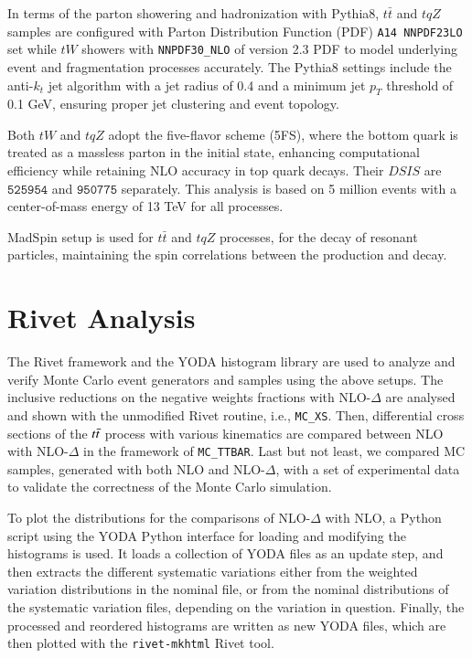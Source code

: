 \documentclass[NOTE, REPORT=true, atlasdraft=true, USenglish]{atlasdoc}
\begin{document}
In terms of the parton showering and hadronization with Pythia8, $t\bar{t}$ and $tqZ$ samples are configured with Parton Distribution Function (PDF) \texttt{A14 NNPDF23LO} set while $tW$ showers with \texttt{NNPDF30\_NLO} of version 2.3 PDF to model underlying event and fragmentation processes accurately. The Pythia8 settings include the anti-$k_t$ jet algorithm with a jet radius of 0.4 and a minimum jet $p_T$ threshold of 0.1 GeV, ensuring proper jet clustering and event topology.

Both $tW$ and $tqZ$ adopt the five-flavor scheme (5FS), where the bottom quark is treated as a massless parton in the initial state, enhancing computational efficiency while retaining NLO accuracy in top quark decays. Their $DSIS$ are 
$\texttt{525954}$ and $\texttt{950775}$ separately. This analysis is based on 5 million events with a center-of-mass energy of 13 TeV for all processes.

MadSpin setup is used for $t\bar{t}$ and $tqZ$ processes, for the decay of resonant particles, maintaining the spin correlations between the production and decay.

\section{Rivet Analysis}
The Rivet framework and the YODA\cite{buckley2024consistentmultidimensionaldifferentialhistogramming} histogram library are used to analyze and verify Monte Carlo event generators and samples using the above setups. The inclusive reductions on the negative weights fractions with NLO-$\Delta$ are analysed and shown with the unmodified Rivet routine, i.e., \texttt{MC\_XS}. Then, differential cross sections of the $t\Bar{t}$ process with various kinematics are compared between NLO with NLO-$\Delta$ in the framework of \texttt{MC\_TTBAR}. Last but not least, we compared MC samples, generated with both NLO and NLO-$\Delta$, with a set of experimental data to validate the correctness of the Monte Carlo simulation.





To plot the distributions for the comparisons of NLO-$\Delta$ with NLO, a Python script using the YODA Python interface for loading and modifying the histograms is used. It loads a collection of YODA files as an update step, and then extracts the different systematic variations either from the weighted variation distributions in the nominal file, or from the nominal distributions of the systematic variation files, depending on the variation in question. Finally, the processed and reordered histograms are written as new YODA files, which are then plotted with the \texttt{rivet-mkhtml} Rivet tool.
\end{document}
